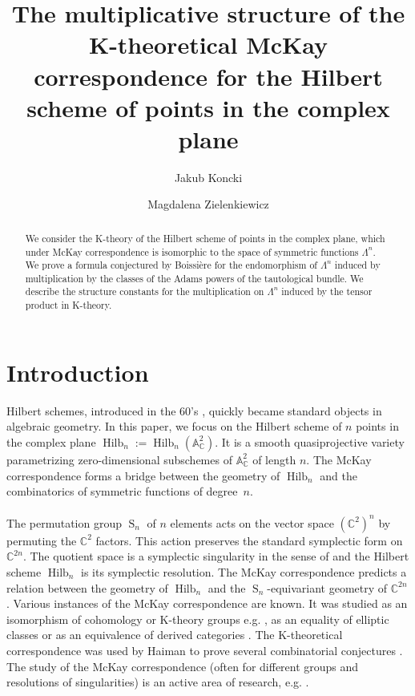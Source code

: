 \documentclass[12pt,a4paper]{amsart}
\title[The multiplicative structure of the McKay correspondence]{The multiplicative structure of the K-theoretical McKay correspondence for the Hilbert scheme of points in the complex plane}
\author{Jakub Koncki}
\author{Magdalena Zielenkiewicz}
\theoremstyle{plain}
\theoremstyle{definition}
\theoremstyle{remark}
\newcommand{\Hilb}[1]{\operatorname{Hilb}_{{#1}}}
\newcommand{\Perm}{\operatorname{S}}
\newcommand{\CC}{\mathbb{C}}
\newcommand{\Aa}{\mathbb{A}}
\begin{document}
\begin{abstract}
We consider the K-theory of the Hilbert scheme of points in the complex plane, which under McKay correspondence is isomorphic to the space of symmetric functions $\Lambda^n$. 
We prove a formula conjectured by Boissière for the endomorphism of $\Lambda^n$ induced by multiplication by the classes of the Adams powers of the tautological bundle.
 We describe the structure constants for the multiplication on $\Lambda^n$ induced by the tensor product in K-theory.
\end{abstract} 

\maketitle
\section{Introduction}
\noindent
Hilbert schemes, introduced in the 60's \cite{Groth}, quickly became standard objects in algebraic geometry. In this paper, we focus on the Hilbert scheme of $n$ points in the complex plane $\Hilb{n}:=\Hilb{n}(\Aa^2_\CC)$. It is a smooth quasiprojective variety parametrizing zero-dimensional subschemes of $\Aa^2_\CC$ of length $n$. The McKay correspondence forms a bridge between the geometry of $\Hilb{n}$ and the combinatorics of symmetric functions of \hbox{degree $n$.}
\\ \\
The permutation group $\Perm_n$ of $n$ elements acts on the vector space $(\CC^{2})^n$ by permuting the $\CC^2$ factors. This action preserves the standard symplectic form on $\CC^{2n}$. The quotient space is a symplectic singularity in the sense of  \cite{Kal,Bea} and the Hilbert scheme $\Hilb{n}$ is its symplectic resolution. The McKay correspondence predicts a relation between the geometry of $\Hilb{n}$ and the $\Perm_n$-equivariant geometry of $\CC^{2n}$.
Various instances of the McKay correspondence are known. It was studied as an isomorphism of cohomology or K-theory groups e.g. \cite{Kal2,ItoNakajima}, as an equality of elliptic classes \cite{BoLi,Waelder} or as an equivalence of derived categories \cite{BKR}. The K-theoretical correspondence was used by Haiman to prove several combinatorial conjectures \cite{Haiman,Haiman2}. The study of the McKay correspondence (often for different groups and resolutions of singularities) is an active area of research, e.g. \cite{Ohmoto,Krug,AW2,Craw,AW}. 
\\ \\
\end{document}
